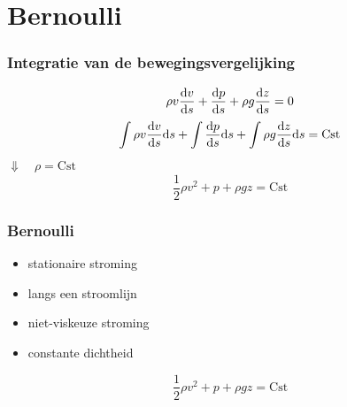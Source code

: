 \documentclass[t]{beamer}
\begin{document}
	\section{Bernoulli}
	\begin{frame}
		\frametitle{Integratie van de bewegingsvergelijking}
		\vspace{1cm}
		\begin{equation*}
			\rho v \frac{\mathrm{d} v}{\mathrm{d} s} + \frac{\mathrm{d} p}{\mathrm{d} s} + \rho g \frac{\mathrm{d} z}{\mathrm{d} s} = 0
		\end{equation*}
		\pause
		\vspace{0.5cm}
		\begin{equation*}
			\int \rho v \frac{\mathrm{d} v}{\mathrm{d} s} \mathrm{d} s + \int \frac{\mathrm{d} p}{\mathrm{d} s} \mathrm{d} s + \int \rho g \frac{\mathrm{d} z}{\mathrm{d} s}  \mathrm{d} s = \text{Cst}
		\end{equation*}
		\pause
        \hspace{5cm} $\Downarrow \quad \rho = \text{Cst}$ 
		\begin{equation}
			\frac{1}{2} \rho v^2 + p + \rho g z = \text{Cst}
			\label{eqn:vergelijking van Bernoulli}
		\end{equation}
  	\end{frame}
  	\begin{frame}
  		\frametitle{Bernoulli}
  		\begin{itemize}
  			\pause
  			\item stationaire stroming
  			\pause
  			\item langs een stroomlijn
  			\pause
  			\item niet-viskeuze stroming
  			\pause
  			\item constante dichtheid
  		\end{itemize}
  		\pause
  		\vspace{1cm}
  		\begin{equation*}
			\frac{1}{2} \rho v^2 + p + \rho g z = \text{Cst}
		\end{equation*}
  	\end{frame}
\end{document}

